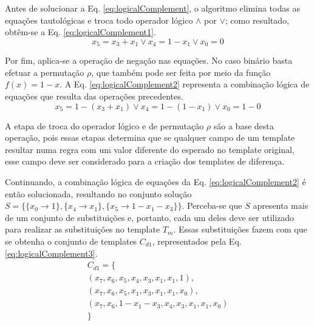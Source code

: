 Antes de solucionar a Eq. \eqref{eq:logicalComplement}, o algoritmo elimina todas as equações tautológicas e troca todo operador lógico $\wedge$ por $\vee$; como resultado, obtêm-se a Eq. \eqref{eq:logicalComplement1}.
\begin{equation}
x_5 = x_3 + x_1 \vee x_4 = 1 - x_1 \vee x_0 = 0
\label{eq:logicalComplement1}
\end{equation}

Por fim,  aplica-se a operação de negação nas equações. No caso binário basta efetuar a permutação $\rho$, que também pode ser feita por meio da função $f(x) = 1 - x$. A Eq. \eqref{eq:logicalComplement2} representa a combinação lógica de equações que resulta das operações precedentes.
\begin{equation}
x_5 = 1 - (x_3 + x_1) \vee x_4 = 1 - (1 - x_1) \vee x_0 = 1 - 0
\label{eq:logicalComplement2}
\end{equation}

A etapa de troca do operador lógico e de permutação $\rho$ são a base desta operação, pois essas etapas determina que se qualquer campo de um template resultar numa regra com um valor diferente do esperado no template original, esse campo deve ser considerado para a criação dos templates de diferença.

Continuando, a combinação lógica de equações da Eq. \eqref{eq:logicalComplement2} é então solucionada, resultando no conjunto solução $S = \{\{x_0 \to 1\}, \{x_4 \to x_1\}, \{x_5 \to 1 - x_1 - x_3\}\}$. Perceba-se que $S$ apresenta mais de um conjunto de substituições e, portanto, cada um deles deve ser utilizado para realizar as substituições no template $T_m$. Essas substituições fazem com que se obtenha o conjunto de templates $C_{d1}$, representados pela Eq. \eqref{eq:logicalComplement3}. 
\begin{equation}
\begin{split}
C_{d1} = \{\\(x_7, x_6, x_5, x_4, x_3, x_1, x_1, 1), \\(x_7, x_6, x_5, x_1, x_3, x_1, x_1, x_0), \\(x_7, x_6, 1 - x_1 - x_3, x_4, x_3, x_1, x_1, x_0)\\\}
\end{split}
\label{eq:logicalComplement3}
\end{equation}

